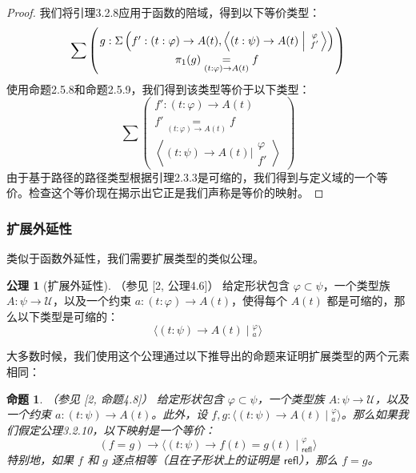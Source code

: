 \documentclass{ctexrep}
\theoremstyle{plain}
\newtheorem{proposition}[theorem]{命题}
\theoremstyle{definition}
\theoremstyle{remark}
\theoremstyle{definition}
\newtheorem{axiom}[theorem]{公理}
\theoremstyle{definition}
\theoremstyle{definition}
\newcommand{\refl}{\mathsf{refl}}
\newcommand{\UU}{\mathcal{U}}
\begin{document}
\begin{proof}
我们将引理3.2.8应用于函数的陪域，得到以下等价类型：
\[
\sum \left( g : \Sigma \left( f' : (t : \varphi) \to A(t), \left\langle (t : \psi) \to A(t) \mathrel{\Big|} \begin{smallmatrix} \varphi \\ f' \end{smallmatrix} \right\rangle \right) \atop \pi_1(g) \underset{(t:\varphi)\to A(t)}{=} f \right)
\]
使用命题2.5.8和命题2.5.9，我们得到该类型等价于以下类型：
\[
\sum \left( \begin{array}{c} f' : (t : \varphi) \to A(t) \\ f' \underset{(t:\varphi)\to A(t)}{=} f \\ \left\langle (t : \psi) \to A(t) \mathrel{\Big|} \begin{smallmatrix} \varphi \\ f' \end{smallmatrix} \right\rangle \end{array} \right)
\]
由于基于路径的路径类型根据引理2.3.3是可缩的，我们得到与定义域的一个等价。检查这个等价现在揭示出它正是我们声称是等价的映射。
\end{proof}

\subsubsection{扩展外延性}

类似于函数外延性，我们需要扩展类型的类似公理。

\begin{axiom}[扩展外延性]（参见 [2, 公理4.6]）
给定形状包含 $\varphi \subset \psi$，一个类型族 $A:\psi \to \UU$，以及一个约束 $a:(t:\varphi)\to A(t)$，使得每个 $A(t)$ 都是可缩的，那么以下类型是可缩的：
\[
\langle (t : \psi) \to A(t) \mid {}^\varphi_a \rangle
\]
\end{axiom}

大多数时候，我们使用这个公理通过以下推导出的命题来证明扩展类型的两个元素相同：

\begin{proposition}（参见 [2, 命题4.8]）
给定形状包含 $\varphi \subset \psi$，一个类型族 $A:\psi \to \UU$，以及一个约束 $a:(t:\psi)\to A(t)$。此外，设 $f,g:\langle (t : \psi) \to A(t) \mid {}^\varphi_a \rangle$。那么如果我们假定公理3.2.10，以下映射是一个等价：
\[
(f = g) \to \langle (t : \psi) \to f(t) = g(t) \mid {}^\varphi_{\refl} \rangle
\]
特别地，如果 $f$ 和 $g$ 逐点相等（且在子形状上的证明是 $\refl$），那么 $f = g$。
\end{proposition}
\end{document}
